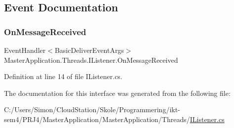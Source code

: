 \subsection{Event Documentation}
\mbox{\label{interface_master_application_1_1_threads_1_1_i_listener_a1fa719996a24e3a7c60660e21e9d9d17}} 
\subsubsection{\texorpdfstring{On\+Message\+Received}{OnMessageReceived}}
{\footnotesize\ttfamily Event\+Handler$<$Basic\+Deliver\+Event\+Args$>$ Master\+Application.\+Threads.\+I\+Listener.\+On\+Message\+Received}



Definition at line 14 of file I\+Listener.\+cs.



The documentation for this interface was generated from the following file\+:\begin{DoxyCompactItemize}
\item 
C\+:/\+Users/\+Simon/\+Cloud\+Station/\+Skole/\+Programmering/ikt-\/sem4/\+P\+R\+J4/\+Master\+Application/\+Master\+Application/\+Threads/\mbox{\hyperlink{_i_listener_8cs}{I\+Listener.\+cs}}\end{DoxyCompactItemize}
